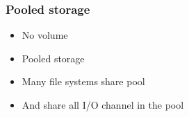 % 
% 
\begin{frame}[fragile]
    \frametitle{Pooled storage}
    \begin{itemize}
        \item No volume
        \item Pooled storage
        \item Many file systems share pool
        \item And share all I/O channel in the pool
    \end{itemize}
\end{frame}
% 
% 
